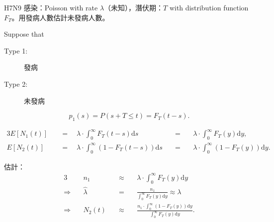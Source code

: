 \begin{example}
H7N9 感染：Poisson with rate $ \lambda $（未知），潛伏期：$ T $ with distribution function $ F_{T} $。用發病人數估計未發病人數。

Suppose that
\begin{description}
  \item[Type 1:] 發病
  \item[Type 2:] 未發病
\end{description}
\[ p_{1}(s) = P(s + T \le t) = F_{T}(t - s). \]

\begin{alignat*}{3}
E[N_{1}(t)]
  & \quad=\quad \lambda \cdot \int_{0}^{\infty} F_{T}(t - s) \mathrm{d}s
  & \quad=\quad & \lambda \cdot \int_{0}^{\infty} F_{T}(y) \mathrm{d}y, \\
E[N_{2}(t)]
  & \quad=\quad \lambda \cdot \int_{0}^{\infty} (1 - F_{T}(t - s)) \mathrm{d}s
  & \quad=\quad & \lambda \cdot \int_{0}^{\infty} (1 - F_{T}(y)) \mathrm{d}y.
\end{alignat*}

估計：
\begin{alignat*}{3}
  & n_{1} & \quad\approx\quad & \lambda \cdot \int_{0}^{\infty} F_{T}(y) \mathrm{d}y \\
\Rightarrow\quad
  & \hat{\lambda} & \quad=\quad & \frac{n_{1}}{\int_{0}^{\infty} F_{T}(y) \mathrm{d}y} \approx \lambda \\
\Rightarrow\quad
  & N_{2}(t) & \quad\approx\quad & \frac{n_{1} \cdot \int_{0}^{\infty} (1 - F_{T}(y)) \mathrm{d}y}{\int_{0}^{\infty} F_{T}(y) \mathrm{d}y}.
\end{alignat*}
\end{example}
